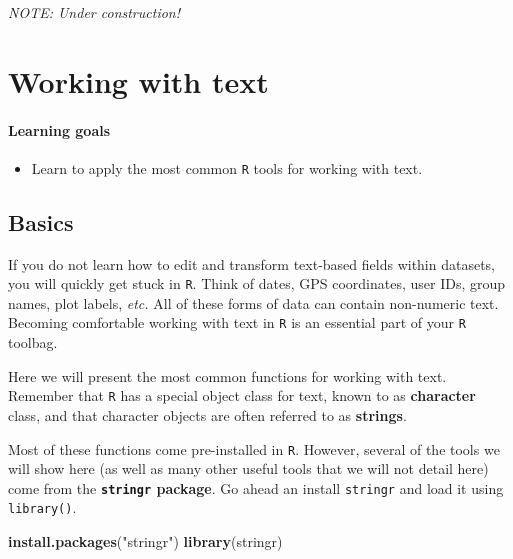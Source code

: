 \documentclass[
]{book}
\newenvironment{Shaded}{\begin{snugshade}}{\end{snugshade}}
\newcommand{\KeywordTok}[1]{\textcolor[rgb]{0.13,0.29,0.53}{\textbf{#1}}}
\newcommand{\NormalTok}[1]{#1}
\newcommand{\StringTok}[1]{\textcolor[rgb]{0.31,0.60,0.02}{#1}}
\providecommand{\tightlist}{%
  \setlength{\itemsep}{0pt}\setlength{\parskip}{0pt}}
\begin{document}
\emph{NOTE: Under construction!}

\hypertarget{working-with-text}{%
\chapter{Working with text}\label{working-with-text}}

\hypertarget{learning-goals-16}{%
\subsubsection*{Learning goals}\label{learning-goals-16}}

\begin{itemize}
\tightlist
\item
  Learn to apply the most common \texttt{R} tools for working with text.
\end{itemize}

\hypertarget{basics-1}{%
\section*{Basics}\label{basics-1}}

If you do not learn how to edit and transform text-based fields within datasets, you will quickly get stuck in \texttt{R}. Think of dates, GPS coordinates, user IDs, group names, plot labels, \emph{etc.} All of these forms of data can contain non-numeric text. Becoming comfortable working with text in \texttt{R} is an essential part of your \texttt{R} toolbag.

Here we will present the most common functions for working with text. Remember that \texttt{R} has a special object class for text, known to as \textbf{character} class, and that character objects are often referred to as \textbf{strings}.

Most of these functions come pre-installed in \texttt{R}. However, several of the tools we will show here (as well as many other useful tools that we will not detail here) come from the \textbf{\texttt{stringr} package}. Go ahead an install \texttt{stringr} and load it using \texttt{library()}.

\begin{Shaded}
\begin{Highlighting}[]
\KeywordTok{install.packages}\NormalTok{(}\StringTok{"stringr"}\NormalTok{)}
\KeywordTok{library}\NormalTok{(stringr)}
\end{Highlighting}
\end{Shaded}
\end{document}
